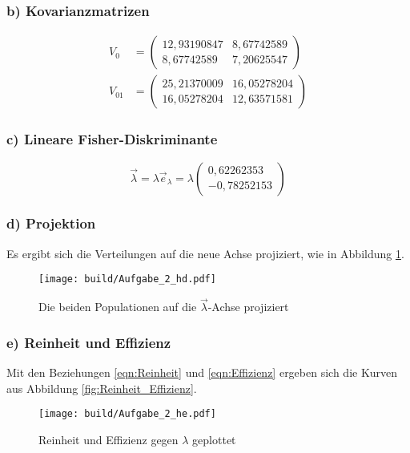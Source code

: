 \subsubsection*{b) Kovarianzmatrizen}
\begin{align}
    V_0&=\left(\begin{array}{cc}
        12,93190847 & 8,67742589\\
        8,67742589  & 7,20625547
    \end{array}\right)\\
    V_{01}&=\left(\begin{array}{cc}
        25,21370009 & 16,05278204\\
        16,05278204 & 12,63571581
    \end{array}\right)
\end{align}

\subsubsection*{c) Lineare Fisher-Diskriminante}
\begin{equation}
    \vec{\lambda}=\lambda\vec{e}_{\lambda}=\lambda\left(\begin{array}{c}
        0,62262353\\
        -0,78252153
    \end{array}\right)
\end{equation}

\subsubsection*{d) Projektion}
Es ergibt sich die Verteilungen auf die neue Achse projiziert, wie in Abbildung \ref{fig:Projektion_1_h}.
\begin{figure}
  \texttt{[image: build/Aufgabe\_2\_hd.pdf]}
  \caption{Die beiden Populationen auf die $\vec{\lambda}$-Achse projiziert}
  \label{fig:Projektion_1_h}
\end{figure}

\subsubsection*{e) Reinheit und Effizienz}
Mit den Beziehungen \eqref{eqn:Reinheit} und \eqref{eqn:Effizienz}
ergeben sich die Kurven aus Abbildung \ref{fig:Reinheit_Effizienz}.
\begin{figure}
  \texttt{[image: build/Aufgabe\_2\_he.pdf]}
  \caption{Reinheit und Effizienz gegen $\lambda$ geplottet}
  \label{fig:Reinheit_Effizienz_h}
\end{figure}

